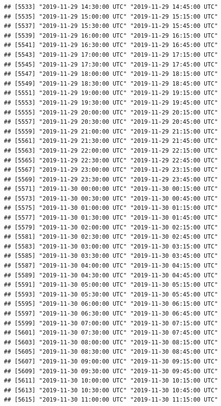 \documentclass{article}\usepackage[]{graphicx}\usepackage[]{color}
\makeatletter
\newenvironment{kframe}{%
 \def\at@end@of@kframe{}%
 \ifinner\ifhmode%
  \def\at@end@of@kframe{\end{minipage}}%
  \begin{minipage}{\columnwidth}%
 \fi\fi%
 \def\FrameCommand##1{\hskip\@totalleftmargin \hskip-\fboxsep
 \colorbox{shadecolor}{##1}\hskip-\fboxsep
     \hskip-\linewidth \hskip-\@totalleftmargin \hskip\columnwidth}%
 \MakeFramed {\advance\hsize-\width
   \@totalleftmargin\z@ \linewidth\hsize
   \@setminipage}}%
 {\par\unskip\endMakeFramed%
 \at@end@of@kframe}
\newenvironment{knitrout}{}{} %
\makeatother
\begin{document}
\begin{knitrout}
\begin{kframe}
\begin{verbatim}
## [5533] "2019-11-29 14:30:00 UTC" "2019-11-29 14:45:00 UTC"
## [5535] "2019-11-29 15:00:00 UTC" "2019-11-29 15:15:00 UTC"
## [5537] "2019-11-29 15:30:00 UTC" "2019-11-29 15:45:00 UTC"
## [5539] "2019-11-29 16:00:00 UTC" "2019-11-29 16:15:00 UTC"
## [5541] "2019-11-29 16:30:00 UTC" "2019-11-29 16:45:00 UTC"
## [5543] "2019-11-29 17:00:00 UTC" "2019-11-29 17:15:00 UTC"
## [5545] "2019-11-29 17:30:00 UTC" "2019-11-29 17:45:00 UTC"
## [5547] "2019-11-29 18:00:00 UTC" "2019-11-29 18:15:00 UTC"
## [5549] "2019-11-29 18:30:00 UTC" "2019-11-29 18:45:00 UTC"
## [5551] "2019-11-29 19:00:00 UTC" "2019-11-29 19:15:00 UTC"
## [5553] "2019-11-29 19:30:00 UTC" "2019-11-29 19:45:00 UTC"
## [5555] "2019-11-29 20:00:00 UTC" "2019-11-29 20:15:00 UTC"
## [5557] "2019-11-29 20:30:00 UTC" "2019-11-29 20:45:00 UTC"
## [5559] "2019-11-29 21:00:00 UTC" "2019-11-29 21:15:00 UTC"
## [5561] "2019-11-29 21:30:00 UTC" "2019-11-29 21:45:00 UTC"
## [5563] "2019-11-29 22:00:00 UTC" "2019-11-29 22:15:00 UTC"
## [5565] "2019-11-29 22:30:00 UTC" "2019-11-29 22:45:00 UTC"
## [5567] "2019-11-29 23:00:00 UTC" "2019-11-29 23:15:00 UTC"
## [5569] "2019-11-29 23:30:00 UTC" "2019-11-29 23:45:00 UTC"
## [5571] "2019-11-30 00:00:00 UTC" "2019-11-30 00:15:00 UTC"
## [5573] "2019-11-30 00:30:00 UTC" "2019-11-30 00:45:00 UTC"
## [5575] "2019-11-30 01:00:00 UTC" "2019-11-30 01:15:00 UTC"
## [5577] "2019-11-30 01:30:00 UTC" "2019-11-30 01:45:00 UTC"
## [5579] "2019-11-30 02:00:00 UTC" "2019-11-30 02:15:00 UTC"
## [5581] "2019-11-30 02:30:00 UTC" "2019-11-30 02:45:00 UTC"
## [5583] "2019-11-30 03:00:00 UTC" "2019-11-30 03:15:00 UTC"
## [5585] "2019-11-30 03:30:00 UTC" "2019-11-30 03:45:00 UTC"
## [5587] "2019-11-30 04:00:00 UTC" "2019-11-30 04:15:00 UTC"
## [5589] "2019-11-30 04:30:00 UTC" "2019-11-30 04:45:00 UTC"
## [5591] "2019-11-30 05:00:00 UTC" "2019-11-30 05:15:00 UTC"
## [5593] "2019-11-30 05:30:00 UTC" "2019-11-30 05:45:00 UTC"
## [5595] "2019-11-30 06:00:00 UTC" "2019-11-30 06:15:00 UTC"
## [5597] "2019-11-30 06:30:00 UTC" "2019-11-30 06:45:00 UTC"
## [5599] "2019-11-30 07:00:00 UTC" "2019-11-30 07:15:00 UTC"
## [5601] "2019-11-30 07:30:00 UTC" "2019-11-30 07:45:00 UTC"
## [5603] "2019-11-30 08:00:00 UTC" "2019-11-30 08:15:00 UTC"
## [5605] "2019-11-30 08:30:00 UTC" "2019-11-30 08:45:00 UTC"
## [5607] "2019-11-30 09:00:00 UTC" "2019-11-30 09:15:00 UTC"
## [5609] "2019-11-30 09:30:00 UTC" "2019-11-30 09:45:00 UTC"
## [5611] "2019-11-30 10:00:00 UTC" "2019-11-30 10:15:00 UTC"
## [5613] "2019-11-30 10:30:00 UTC" "2019-11-30 10:45:00 UTC"
## [5615] "2019-11-30 11:00:00 UTC" "2019-11-30 11:15:00 UTC"

\end{verbatim}
\end{kframe}
\end{knitrout}
\end{document}
